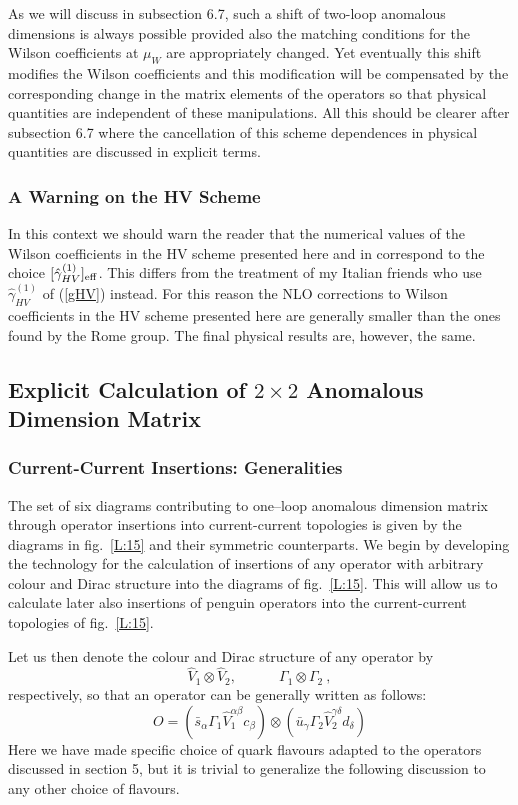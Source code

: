 \documentclass[12pt]{article}
\newcommand{\be}{\begin{equation}}
\newcommand{\ee}{\end{equation}}
\begin{document}
\begin{itemize}
\begin{itemize}
\begin{itemize}
As we will discuss in subsection 6.7,
such a shift of two-loop anomalous dimensions is always possible
provided also the matching conditions for the Wilson coefficients
at $\mu_W$ are appropriately changed. Yet eventually this shift
modifies the Wilson coefficients and this modification will be
compensated by the corresponding change in the matrix elements
of the operators so that physical quantities are independent
of these manipulations. All this should be clearer after
subsection 6.7 where the
cancellation of this scheme dependences in physical quantities are
discussed in explicit terms.
\subsubsection{A Warning on the HV Scheme}
In this context we should warn the reader that the numerical
values of the Wilson coefficients in the HV scheme presented here
and in \cite{BBL,BJLW}
 correspond to the choice $[\hat\gamma^{(1)}_{HV}]_{\rm eff}$.
This differs from the treatment of my Italian friends 
\cite{ROMA1,ROMA2} who use
$\hat\gamma^{(1)}_{HV}$ of (\ref{gHV}) instead. For this reason the
NLO corrections to Wilson coefficients in the HV scheme presented 
here are generally smaller
than the ones found by the Rome group. The final physical results
are, however, the same.
\subsection{Explicit Calculation of $2\times 2$ 
Anomalous Dimension Matrix}
\subsubsection{Current-Current Insertions: Generalities}
The set of six diagrams contributing to one--loop anomalous dimension 
matrix through operator
insertions into current-current topologies is given by the diagrams in 
fig.~\ref{L:15} and their symmetric counterparts.
We begin by developing the technology for the calculation of insertions
of any operator with arbitrary colour and Dirac structure into the
diagrams of fig.~\ref{L:15}. 
This will allow us to calculate later also insertions
of penguin operators into the current-current topologies of 
fig.~\ref{L:15}.

Let us then denote the colour and Dirac structure of any operator
by
\be\label{CD}
\hat V_1\otimes\hat V_2,\quad\quad\quad \Gamma_1\otimes\Gamma_2~,
\ee
respectively, so that an operator can be generally written as follows:
\be\label{OG}
O=(\bar s_\alpha \Gamma_1 \hat V_1^{\alpha\beta} c_\beta)\otimes 
  (\bar u_\gamma \Gamma_2 \hat V_2^{\gamma\delta} d_\delta)
\ee
Here we have made  specific choice of quark flavours adapted to the
operators discussed in section 5, but it is trivial to generalize
the following discussion to any other choice of flavours.


\end{itemize}
\end{itemize}
\end{itemize}
\end{document}
